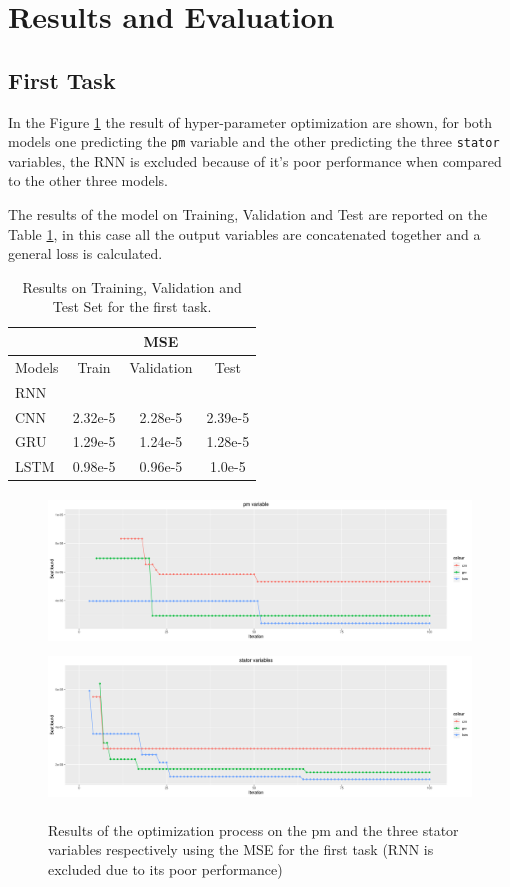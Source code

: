 \section{Results and Evaluation}
 
\subsection{First Task}
In the Figure \ref{fig:automl_mse} the result of hyper-parameter optimization are shown, for both models one predicting the \verb|pm| variable and the other predicting the three \verb|stator| variables, the RNN is excluded because of it's poor performance when compared to the other three models.

The results of the model on Training, Validation and Test are reported on the Table \ref{tab:first}, in this case all the output variables are concatenated together and a general loss is calculated.
\begin{table}[!h]
  \centering
  \begin{tabular}{|l|c|c|c|}
    \hline
    & \multicolumn{3}{|c|}{MSE} \\
    \hline
    Models & Train & Validation & Test \\
    \hline
    RNN & & & \\
    CNN & 2.32e-5 & 2.28e-5  & 2.39e-5 \\
    GRU & 1.29e-5 & 1.24e-5 & 1.28e-5 \\
    LSTM & 0.98e-5 & 0.96e-5 & 1.0e-5 \\
    \hline
  \end{tabular}
  \caption{Results on Training, Validation and Test Set for the first task.}
  \label{tab:first}
\end{table}
\begin{figure}[!h]
    \centering
    \includegraphics[width=\linewidth, height=4cm]{imgs/comparison_MSE.png}
    \includegraphics[width=\linewidth, height=4cm]{imgs/comparison_MSE_stator.png}
    \caption{Results of the optimization process on the pm and the three stator variables respectively using the MSE for the first task (RNN is excluded due to its poor performance)}
    \label{fig:automl_mse}
\end{figure}
  
